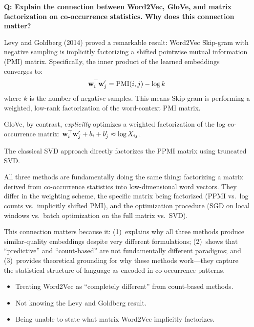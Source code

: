 \begin{interviewq}
\textbf{Q: Explain the connection between Word2Vec, GloVe, and matrix
factorization on co-occurrence statistics. Why does this connection matter?}

 \quad {} \quad \badgefreq{\freqmed}

\stronganswer
Levy and Goldberg (2014) proved a remarkable result: Word2Vec Skip-gram with
negative sampling is implicitly factorizing a shifted pointwise mutual
information (PMI) matrix.  Specifically, the inner product of the learned
embeddings converges to:
\[
    \mathbf{w}_i^\top \mathbf{w}'_j = \text{PMI}(i, j) - \log k
\]
where $k$ is the number of negative samples.  This means Skip-gram is
performing a weighted, low-rank factorization of the word-context PMI matrix.

GloVe, by contrast, \emph{explicitly} optimizes a weighted factorization of
the log co-occurrence matrix:
$\mathbf{w}_i^\top \mathbf{w}'_j + b_i + b'_j \approx \log X_{ij}$.

The classical SVD approach directly factorizes the PPMI matrix using truncated
SVD.

All three methods are fundamentally doing the same thing: factorizing a
matrix derived from co-occurrence statistics into low-dimensional word
vectors.  They differ in the weighting scheme, the specific matrix being
factorized (PPMI vs.\ log counts vs.\ implicitly shifted PMI), and the
optimization procedure (SGD on local windows vs.\ batch optimization on the
full matrix vs.\ SVD).

This connection matters because it: (1)~explains why all three methods produce
similar-quality embeddings despite very different formulations; (2)~shows that
``predictive'' and ``count-based'' are not fundamentally different paradigms;
and (3)~provides theoretical grounding for why these methods work---they
capture the statistical structure of language as encoded in co-occurrence
patterns.

\redflags
\begin{itemize}
    \item Treating Word2Vec as ``completely different'' from count-based
    methods.
    \item Not knowing the Levy and Goldberg result.
    \item Being unable to state what matrix Word2Vec implicitly factorizes.
\end{itemize}



\end{interviewq}
